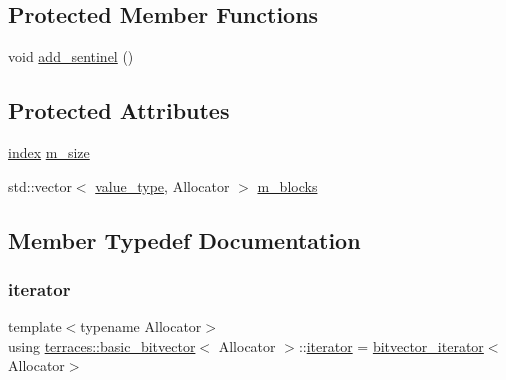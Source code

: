 \subsection*{Protected Member Functions}
\begin{DoxyCompactItemize}
\item 
void \hyperlink{classterraces_1_1basic__bitvector_ad5a0a0f50c0f41c8f0f10ea74cd272fa}{add\+\_\+sentinel} ()
\end{DoxyCompactItemize}
\subsection*{Protected Attributes}
\begin{DoxyCompactItemize}
\item 
\hyperlink{namespaceterraces_adbc33ccb543d1634e96d0eb02e472c77}{index} \hyperlink{classterraces_1_1basic__bitvector_ac78f807a89b0bfca92d855ebf1b61206}{m\+\_\+size}
\item 
std\+::vector$<$ \hyperlink{classterraces_1_1basic__bitvector_ad076eceb68c15a18925cd409e6eaac11}{value\+\_\+type}, Allocator $>$ \hyperlink{classterraces_1_1basic__bitvector_a65d3b2d2706a757fa305b725508a3830}{m\+\_\+blocks}
\end{DoxyCompactItemize}


\subsection{Member Typedef Documentation}
\mbox{\label{classterraces_1_1basic__bitvector_aff8b2ad5a1518f6d8b157df0d2f77bdd}} 
\subsubsection{\texorpdfstring{iterator}{iterator}}
{\footnotesize\ttfamily template$<$typename Allocator$>$ \\
using \hyperlink{classterraces_1_1basic__bitvector}{terraces\+::basic\+\_\+bitvector}$<$ Allocator $>$\+::\hyperlink{classterraces_1_1basic__bitvector_aff8b2ad5a1518f6d8b157df0d2f77bdd}{iterator} =  \hyperlink{classterraces_1_1bitvector__iterator}{bitvector\+\_\+iterator}$<$Allocator$>$}

\mbox{\label{classterraces_1_1basic__bitvector_ad076eceb68c15a18925cd409e6eaac11}} 
